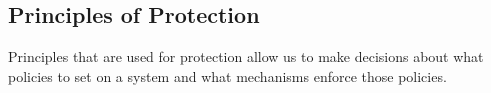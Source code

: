 \subsection{Principles of Protection}\label{subsec:Protection_Principles}
Principles that are used for protection allow us to make decisions about what policies to set on a system and what mechanisms enforce those policies.

